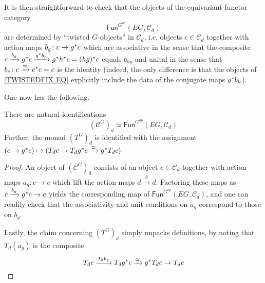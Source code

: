 \documentclass[a4paper,10pt
,draft
]{article}%
\renewcommand{\1}{\eta}%
\begin{document}
It is then straightforward to check that the objects of the equivariant functor category
\begin{equation}\label{TWISTEDFIX EQ}
\mathsf{Fun}^{G^{op}}(EG,\mathcal{C}_d)
\end{equation}
are determined by ``twisted $G$-objects'' in $\mathcal{C}_d$, i.e. objects 
$c\in \mathcal{C}_d$
together with action maps 
$b_g \colon c \to g^{\**}c$
which are associative in the sense that the composite
$c \xrightarrow{b_g} g^{\**}c \xrightarrow{g^{\**}b_h} g^{\**} h^{\**} c = (hg)^{\**}c$ equals $b_{hg}$
and unital in the sense that
$b_e \colon c \xrightarrow{=} e^{\**}c = c$
is the identity
(indeed, the only difference is that the
objects of \ref{TWISTEDFIX EQ} explicitly include the data
of the conjugate maps $g^{\**}b_h$).

One now has the following.



\begin{proposition}
There are natural identifications
\[
\left(\mathcal{C}^G\right)_d \simeq
\mathsf{Fun}^{G^{op}}(EG,\mathcal{C}_d)
\]
Further, the monad $\left(T^G\right)_d$
is identified with the assignment
$(c \to g^{\**}c) \mapsto 
(T_d c \to T_dg^{\**}c \xrightarrow{\simeq} g^{\**}T_d c)$.
\end{proposition}



\begin{proof}
An object of $\left(\mathcal{C}^G\right)_d$
consists of an object $c \in \mathcal{C}_d$ together with action maps
$a_g\colon c \to c$ which lift the action maps $d \xrightarrow{g} d$.
Factoring these maps
as $c \xrightarrow{b_g} g^{\**}c \to c$
yields the corresponding map of $\mathsf{Fun}^{G^{op}}(EG,\mathcal{C}_d)$,
and one can readily check that the associativity and unit conditions on $a_g$ correspond to those on $b_g$.

Lastly, the claim concerning $\left(T^G\right)_d$ simply unpacks definitions, by noting that
$T_d(a_g)$ is the composite
\[
T_d c \xrightarrow{T_d b_g}
T_d g^{\**} c \xrightarrow{\simeq} 
g^{\**} T_d c  \to T_d c 
\]
\end{proof}







{}

\end{document}
